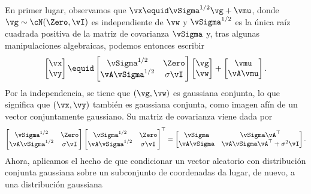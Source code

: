 \documentclass[../../book-main_es.tex]{subfiles}
\begin{document}
\begin{example}
    En primer lugar, observamos que $\vx \equid \vSigma^{1/2} \vg + \vmu$, donde $\vg \sim
    \cN(\Zero, \vI)$ es independiente de $\vw$ y $\vSigma^{1/2}$ es la única
    raíz cuadrada positiva de la matriz de covarianza $\vSigma$ y,
    tras algunas manipulaciones algebraicas, podemos entonces escribir 
    \begin{equation*}
        \begin{bmatrix}
            \vx \\
            \vy
        \end{bmatrix}
        \equid
        \begin{bmatrix}
            \vSigma^{1/2} & \Zero \\
            \vA \vSigma^{1/2} & \sigma \vI
        \end{bmatrix}
        \begin{bmatrix}
            \vg \\
            \vw
        \end{bmatrix}
        +
        \begin{bmatrix}
            \vmu \\
            \vA\vmu
        \end{bmatrix}.
    \end{equation*}
    Por la independencia, se tiene que $(\vg, \vw)$ es gaussiana conjunta,
    lo que significa que
    $(\vx, \vy)$ también es gaussiana conjunta, como imagen afín de un
    vector conjuntamente gaussiano.
    Su matriz de covarianza viene dada por
    \begin{equation*}
        \begin{bmatrix}
            \vSigma^{1/2} & \Zero \\
            \vA \vSigma^{1/2} & \sigma \vI
        \end{bmatrix}
        \begin{bmatrix}
            \vSigma^{1/2} & \Zero \\
            \vA \vSigma^{1/2} & \sigma \vI
        \end{bmatrix}^\top
        =
        \begin{bmatrix}
            \vSigma & \vSigma \vA^\top \\
            \vA \vSigma & \vA \vSigma \vA^\top + \sigma^2 \vI
        \end{bmatrix}.
    \end{equation*}
    Ahora, aplicamos el hecho de que condicionar un vector aleatorio con distribución conjunta gaussiana 
    sobre un subconjunto de coordenadas da lugar, de nuevo, a una distribución gaussiana

\end{example}
\end{document}
